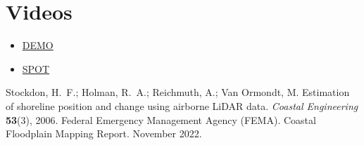 \documentclass{article}
\begin{document}
\section{Videos}
    \begin{itemize}
        \item \href{https://www.youtube.com/watch?v=GD0r5xGcenA}{DEMO}
        \item \href{https://www.youtube.com/watch?v=TnTkD0Kx9Sg}{SPOT}
    \end{itemize}
    
\begin{thebibliography}{9}
        Stockdon, H.~F.; Holman, R.~A.; Reichmuth, A.; Van Ormondt, M.  
        Estimation of shoreline position and change using airborne LiDAR data.  
    \emph{Coastal Engineering} \textbf{53}(3), 2006.
        Federal Emergency Management Agency (FEMA).  
        Coastal Floodplain Mapping Report. November 2022.
\end{thebibliography}
\end{document}
